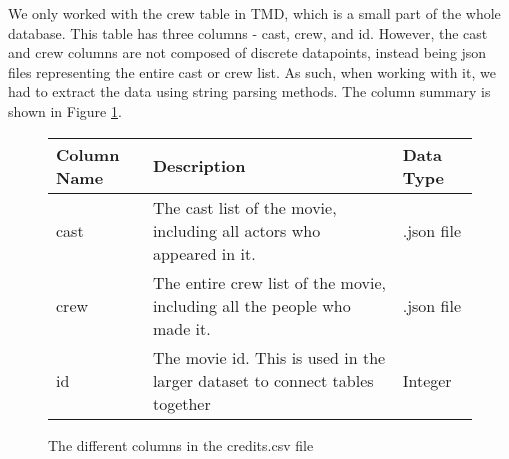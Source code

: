         We only worked with the crew table in TMD, which is a small part of the whole database.
        This table has three columns - cast, crew, and id.
        However, the cast and crew columns are not composed of discrete datapoints, instead being json files representing the entire cast or crew list.
        As such, when working with it, we had to extract the data using string parsing methods.
        The column summary is shown in Figure \ref*{fig-Credits-Column-Description}.
        \begin{figure}[h]
            \centering
            \begin{tabular}[width = \textwidth]{lll}
                \toprule
                Column Name &           Description                                                                 & Data Type  \\
                \midrule
                cast &                  The cast list of the movie, including all actors who appeared in it.        & .json file \\          
                crew &                  The entire crew list of the movie, including all the people who made it.    & .json file \\
                id &                    The movie id. This is used in the larger dataset to connect tables together & Integer     \\        
                \bottomrule
            \end{tabular}
            \caption[short]{The different columns in the credits.csv file}\label{fig-Credits-Column-Description}
        \end{figure}

